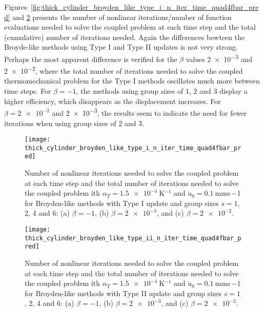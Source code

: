 Figures~\ref{fig:thick_cylinder_broyden_like_type_i_n_iter_time_quad4fbar_pred} and \ref{fig:thick_cylinder_broyden_like_type_ii_n_iter_time_quad4fbar_pred} presents the number of nonlinear iterations/number of function evaluations needed to solve the coupled problem at each time step and the total (cumulative) number of iterations needed.
Again the differences bewteen the Broyde-like methods using Type I and Type II updates is not very strong.
Perhaps the most apparent difference is verified for the \(\beta\) values \num{2e-3} and \num{2e-2}, where the total number of iterations needed to solve the coupled thermomechanical problem for the Type I methods oscillates much more between time steps.
For \(\beta=-1\), the methods using group sizes of 1, 2 and 3 display a higher efficiency, which disappears as the displacement increases.
For \(\beta=\num{2e-2}\) and \num{2e-3}, the results seem to indicate the need for fewer iterations when using group sizes of 2 and 3.

\begin{figure}
  \texttt{[image: thick\_cylinder\_broyden\_like\_type\_i\_n\_iter\_time\_quad4fbar\_pred]}
  \caption{Number of nonlinear iterations needed to solve the coupled problem at each time step and the total number of iterations needed to solve the coupled problem ith \(\alpha_T=\SI{1.5e-4}{\kelvin^{-1}}\) and \(\dot u_0 =\SI{0.1}{\milli\meter\second~{-1}}\) for Broyden-like methods with Type I update and group sizes \(s=1\), 2, 4 and 6: (a) \(\beta=-1\), (b) \(\beta=\num{2e-3}\), and (c) \(\beta=\num{2e-2}\).}
\label{thick_cylinder_broyden_like_type_i_n_iter_time_quad4fbar_pred}
\end{figure}

\begin{figure}
  \texttt{[image: thick\_cylinder\_broyden\_like\_type\_ii\_n\_iter\_time\_quad4fbar\_pred]}
  \caption{Number of nonlinear iterations needed to solve the coupled problem at each time step and the total number of iterations needed to solve the coupled problem ith \(\alpha_T=\SI{1.5e-4}{\kelvin^{-1}}\) and \(\dot u_0 =\SI{0.1}{\milli\meter\second~{-1}}\) for Broyden-like methods with Type II update and group sizes \(s=1\), 2, 4 and 6: (a) \(\beta=-1\), (b) \(\beta=\num{2e-3}\), and (c) \(\beta=\num{2e-2}\).}
\label{fig:thick_cylinder_broyden_like_type_ii_n_iter_time_quad4fbar_pred}
\end{figure}

